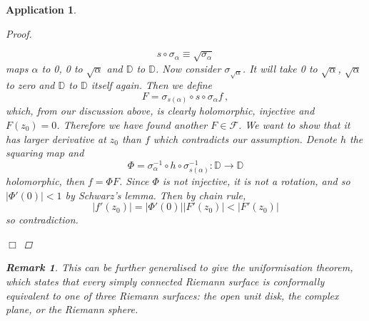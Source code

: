 \documentclass{article}
\theoremstyle{plain}\theoremheaderfont{\normalfont\itshape}\theorembodyfont{\rmfamily}\theoremseparator{.}\newtheorem*{rem}{Remark}\newtheorem*{ex}{Example}\newtheorem*{proof}{Proof}\newtheorem*{altp}{Alternative proof}\newtheorem*{con}{Consequences}\newtheorem*{notn}{Notations}\newtheorem*{cau}{Caution}\newtheorem*{term}{Terminology}\newtheorem*{keyex}{Key example}
\theoremstyle{plain}\theoremheaderfont{\normalfont\bfseries}\theorembodyfont{\rmfamily}\theoremseparator{.}\newtheorem{thm}{Theorem}[section]\newtheorem{lem}[thm]{Lemma}\newtheorem{prop}[thm]{Proposition}\newtheorem*{cor}{Corollary}\newtheorem{defn}[thm]{Definition}\newtheorem{clm}[thm]{Claim}\newtheorem{clminproof}{Claim}\newtheorem{leminproof}{Lemma}\newtheorem{app}{Application}
\theoremstyle{break}\theoremheaderfont{\normalfont\itshape}\theorembodyfont{\rmfamily}\theoremseparator{.\medskip}\newtheorem*{proofskip}{Proof}\newtheorem*{exs}{Examples}\newtheorem*{rems}{Remarks}\newtheorem*{rec}{Recall}\newtheorem*{ppts}{Properties}
\theoremstyle{break}\theoremheaderfont{\normalfont\bfseries}\theorembodyfont{\rmfamily}\theoremseparator{.\medskip}\newtheorem{lemskip}[thm]{Lemma}\newtheorem{defnskip}[thm]{Definition}\newtheorem{propskip}[thm]{Proposition}\newtheorem{thmskip}[thm]{Theorem}
\numberwithin{equation}{section}
\newcommand{\qed}{\hfill\ensuremath{\Box}}
\newcommand{\abs}[1]{\left|#1\right|}
\newcommand{\DD}{\mathbb{D}}
\begin{document}
\begin{app}
\begin{proof}
\begin{enumerate}[topsep=0pt]
                \[s\circ\sigma_{\alpha}\equiv\sqrt{\sigma_\alpha}\]
                maps \(\alpha\) to 0, 0 to \(\sqrt{\alpha}\) and \(\DD\) to \(\DD\). Now consider \(\sigma_{\sqrt{\alpha}}\). It will take 0 to \(\sqrt{\alpha}\), \(\sqrt{\alpha}\) to zero and \(\DD\) to \(\DD\) itself again. Then we define
                \[F=\sigma_{s(\alpha)}\circ s\circ\sigma_{\alpha}f\,,\]
                which, from our discussion above, is clearly holomorphic, injective and \(F(z_0)=0\). Therefore we have found another \(F\in\mathcal{F}\). We want to show that it has larger derivative at \(z_0\) than \(f\) which contradicts our assumption. Denote \(h\) the squaring map and
                \[\Phi=\sigma_{\alpha}^{-1}\circ h\circ\sigma_{s(\alpha)}^{-1}:\DD\to\DD\]
                holomorphic, then \(f=\Phi F\). Since \(\Phi\) is not injective, it is not a rotation, and so \(\abs{\Phi'(0)}<1\) by Schwarz's lemma. Then by chain rule,
                \[\abs{f'(z_0)}=\abs{\Phi'(0)}\abs{F'(z_0)}<\abs{F'(z_0)}\]
                so contradiction.
            \end{enumerate}\qed
        \end{proof}
        \begin{rem}
            This can be further generalised to give the uniformisation theorem, which states that every simply connected Riemann surface is conformally equivalent to one of three Riemann surfaces: the open unit disk, the complex plane, or the Riemann sphere.
        \end{rem}
    \end{app}
\end{document}
